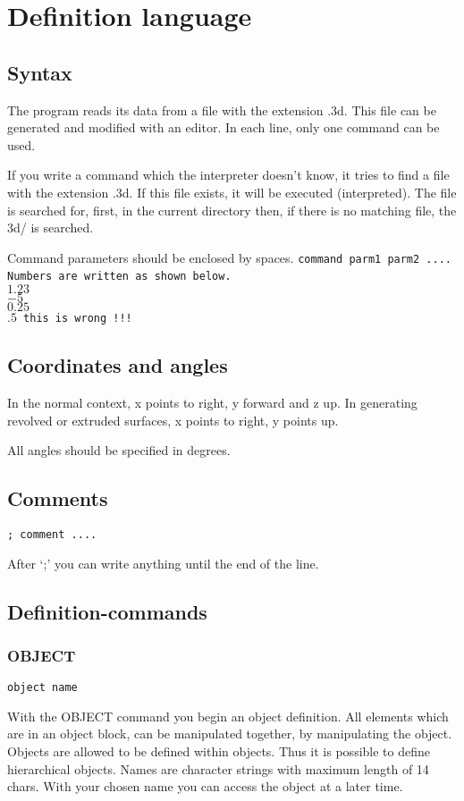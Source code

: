 \section{Definition language}

\subsection{Syntax}
The program reads its data from a file with the extension .3d. This file can
be generated and modified with an editor. In each line, only one command can
be used.

If you write a command which the interpreter doesn't know, it tries to find
a file with the extension .3d. If this file exists, it will be executed
(interpreted). The file is searched for, first, in the current directory
then, if there is no matching file, the 3d/ is searched.

Command parameters should be enclosed by spaces.
\tt{command parm1 parm2 ...}. Numbers are written as shown below.
\tt{
\\
$1.23$\\
$-5$\\
$0.25$\\
$.5$ this is wrong !!!
}

\subsection{Coordinates and angles}
In the normal context, x points to right, y forward and z up.
In generating revolved or extruded surfaces, x points to right, y points up.

All angles should be specified in degrees.

\subsection{Comments}
\tt{; comment .... }

After `;' you can write anything until the end of the line.

\subsection{Definition-commands}
\subsubsection{OBJECT}
\tt{object name}

With the OBJECT command you begin an object definition. All elements which
are in an object block, can be manipulated together, by manipulating the
object. Objects are allowed to be defined within objects. Thus it is
possible to define hierarchical objects. Names are character strings with
maximum length of 14 chars. With your chosen name you can access the object
at a later time.

